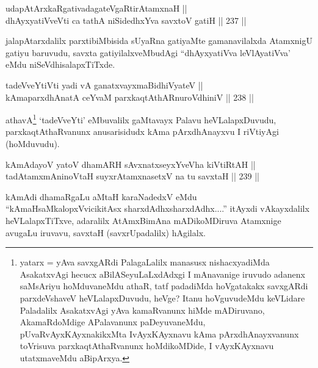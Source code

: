 
\begin{shl}
udapAtArxkaRgativadagateVgaRtirAtamxnaH || \\
dhAyxyatiVveVti ca tathA niSidedhxYva savxtoV gatiH \hfill || 237 ||  
\end{shl}

\begin{artha}
jalapAtarxdalilx parxtibiMbisida sUyaRna gatiyaMte gamanavilalxda
AtamxnigU gatiyu baruvudu, savxta gatiyilalxveMbudAgi ``dhAyxyatiVva
leVlAyatiVva' eMdu niSeVdhisalapxTiTxde.
\end{artha}


\begin{shl}
tadeVveYtiVti yadi vA ganatxvayxmaBidhiVyateV || \\
kAmaparxdhAnatA ceYvaM parxkaqtAthARnuroVdhiniV \hfill || 238 ||  
\end{shl}

\begin{artha}
athavA\footnote{yatarx = yAva savxgARdi PalagaLalilx manasusx
nishacxyadiMda AsakatxvAgi hecucx aBilASeyuLaLxdAdxgi I mAnavanige
iruvudo adanenx saMsAriyu hoMduvaneMdu athaR, tatf padadiMda
hoVgatakakx savxgARdi parxdeVshaveV heVLalapxDuvudu, heVge? Itanu
hoVguvudeMdu keVLidare Paladalilx AsakatxvAgi yAva kamaRvanunx hiMde
mADiruvano, AkamaRdoMdige APalavanunx paDeyuvaneMdu,
pUvaRvAyxKAyxnakikxMta IvAyxKAyxnavu kAma pArxdhAnayxvanunx
toVrisuva parxkaqtAthaRvanunx hoMdikoMDide, I vAyxKAyxnavu
utatxmaveMdu aBipArxya.} `tadeVveYti' eMbuvalilx gaMtavayx Palavu
heVLalapxDuvudu, parxkaqtAthaRvanunx anusarisidudx kAma pArxdhAnayxvu
I riVtiyAgi (hoMduvudu).
\end{artha}

\begin{shl}
kAmAdayoV yatoV dhamARH sAvxnatxseyxYveVha kiVtiRtAH || \\
tadAtamxmAninoV\s taH suyxrAtamxnasetxV na tu savxtaH \hfill || 239 ||  
\end{shl}

\begin{artha}
kAmAdi dhamaRgaLu aMtaH karaNadedxV eMdu ``kAmaH\break saMkalopxVvicikitAsx
sharxdAdhx\s sharxdAdhx....'' itAyxdi vAkayxdalilx heVLalapxTiTxve,
adaralilx AtAmxBimAna mADikoMDiruva Atamxnige avugaLu iruvavu, savxtaH
(savxrUpadalilx) hAgilalx.
\end{artha}

